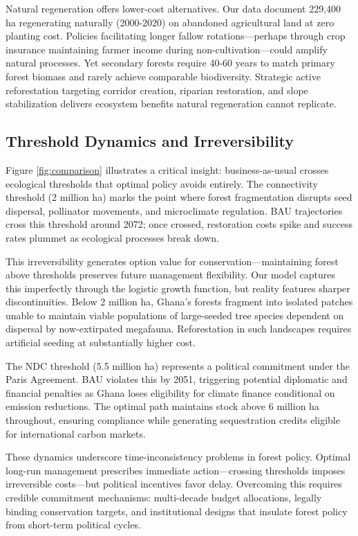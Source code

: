 Natural regeneration offers lower-cost alternatives. Our data document 229,400 ha regenerating naturally (2000-2020) on abandoned agricultural land at zero planting cost. Policies facilitating longer fallow rotations—perhaps through crop insurance maintaining farmer income during non-cultivation—could amplify natural processes. Yet secondary forests require 40-60 years to match primary forest biomass and rarely achieve comparable biodiversity. Strategic active reforestation targeting corridor creation, riparian restoration, and slope stabilization delivers ecosystem benefits natural regeneration cannot replicate.

\subsection{Threshold Dynamics and Irreversibility}

Figure \ref{fig:comparison} illustrates a critical insight: business-as-usual crosses ecological thresholds that optimal policy avoids entirely. The connectivity threshold (2 million ha) marks the point where forest fragmentation disrupts seed dispersal, pollinator movements, and microclimate regulation. BAU trajectories cross this threshold around 2072; once crossed, restoration costs spike and success rates plummet as ecological processes break down.

This irreversibility generates option value for conservation—maintaining forest above thresholds preserves future management flexibility. Our model captures this imperfectly through the logistic growth function, but reality features sharper discontinuities. Below 2 million ha, Ghana's forests fragment into isolated patches unable to maintain viable populations of large-seeded tree species dependent on dispersal by now-extirpated megafauna. Reforestation in such landscapes requires artificial seeding at substantially higher cost.

The NDC threshold (5.5 million ha) represents a political commitment under the Paris Agreement. BAU violates this by 2051, triggering potential diplomatic and financial penalties as Ghana loses eligibility for climate finance conditional on emission reductions. The optimal path maintains stock above 6 million ha throughout, ensuring compliance while generating sequestration credits eligible for international carbon markets.

These dynamics underscore time-inconsistency problems in forest policy. Optimal long-run management prescribes immediate action—crossing thresholds imposes irreversible costs—but political incentives favor delay. Overcoming this requires credible commitment mechanisms: multi-decade budget allocations, legally binding conservation targets, and institutional designs that insulate forest policy from short-term political cycles.

